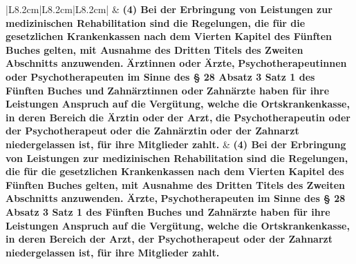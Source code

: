 \documentclass[10pt,a4paper,landscape]{article}
\begin{document}
\begin{longtable}{|L{8.2cm}|L{8.2cm}|L{8.2cm}|}
 & \textbf{(4) Bei der Erbringung von Leistungen  \newline zur medizinischen Rehabilitation sind  \newline die Regelungen, die für die gesetzlichen  \newline Krankenkassen nach dem Vierten  \newline Kapitel des Fünften Buches gelten, mit  \newline Ausnahme des Dritten Titels des  \newline Zweiten Abschnitts anzuwenden.} \newline \textbf{\textcolor{diffred}{Ärztinnen oder}}\textbf{ Ärzte,} \newline \textbf{\textcolor{diffred}{Psychotherapeutinnen oder}}\textbf{  \newline Psychotherapeuten im Sinne des \S{} 28  \newline Absatz 3 Satz 1 des Fünften Buches und} \newline \textbf{\textcolor{diffred}{Zahnärztinnen oder}}\textbf{ Zahnärzte haben für  \newline ihre Leistungen Anspruch auf die  \newline Vergütung, welche die  \newline Ortskrankenkasse, in deren Bereich }\textbf{\textcolor{diffred}{die  \newline Ärztin oder}}\textbf{ der Arzt, }\textbf{\textcolor{diffred}{die  \newline Psychotherapeutin oder}}\textbf{ der  \newline Psychotherapeut }\textbf{\textcolor{diffred}{oder die Zahnärztin}}\textbf{  \newline oder der Zahnarzt niedergelassen ist,  \newline für ihre Mitglieder zahlt. } & \textbf{(4) Bei der Erbringung von Leistungen  \newline zur medizinischen Rehabilitation sind  \newline die Regelungen, die für die gesetzlichen  \newline Krankenkassen nach dem Vierten  \newline Kapitel des Fünften Buches gelten, mit  \newline Ausnahme des Dritten Titels des  \newline Zweiten Abschnitts anzuwenden. Ärzte, } \textbf{Psychotherapeuten im Sinne des \S{} 28  \newline Absatz 3 Satz 1 des Fünften Buches und  \newline Zahnärzte haben für ihre Leistungen  \newline Anspruch auf die Vergütung, welche die  \newline Ortskrankenkasse, in deren Bereich der  \newline Arzt, der Psychotherapeut oder der  \newline Zahnarzt niedergelassen ist, für ihre  \newline Mitglieder zahlt. } \\

\end{longtable}
\end{document}
